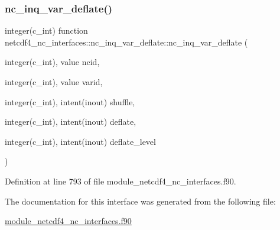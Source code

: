 \subsubsection{\texorpdfstring{nc\+\_\+inq\+\_\+var\+\_\+deflate()}{nc\_inq\_var\_deflate()}}
{\footnotesize\ttfamily integer(c\+\_\+int) function netcdf4\+\_\+nc\+\_\+interfaces\+::nc\+\_\+inq\+\_\+var\+\_\+deflate\+::nc\+\_\+inq\+\_\+var\+\_\+deflate (\begin{DoxyParamCaption}\item[{integer(c\+\_\+int), value}]{ncid,  }\item[{integer(c\+\_\+int), value}]{varid,  }\item[{integer(c\+\_\+int), intent(inout)}]{shuffle,  }\item[{integer(c\+\_\+int), intent(inout)}]{deflate,  }\item[{integer(c\+\_\+int), intent(inout)}]{deflate\+\_\+level }\end{DoxyParamCaption})}



Definition at line 793 of file module\+\_\+netcdf4\+\_\+nc\+\_\+interfaces.\+f90.



The documentation for this interface was generated from the following file\+:\begin{DoxyCompactItemize}
\item 
\hyperlink{module__netcdf4__nc__interfaces_8f90}{module\+\_\+netcdf4\+\_\+nc\+\_\+interfaces.\+f90}\end{DoxyCompactItemize}

